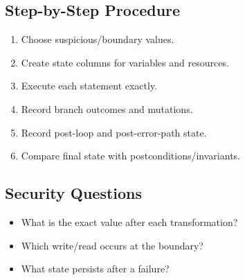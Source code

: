 \documentclass[10pt]{article}
\begin{document}
\subsection*{Step-by-Step Procedure}
\begin{enumerate}
\item Choose suspicious/boundary values.
\item Create state columns for variables and resources.
\item Execute each statement exactly.
\item Record branch outcomes and mutations.
\item Record post-loop and post-error-path state.
\item Compare final state with postconditions/invariants.
\end{enumerate}
\subsection*{Security Questions}
\begin{itemize}
\item What is the exact value after each transformation?
\item Which write/read occurs at the boundary?
\item What state persists after a failure?
\end{itemize}

\end{document}
